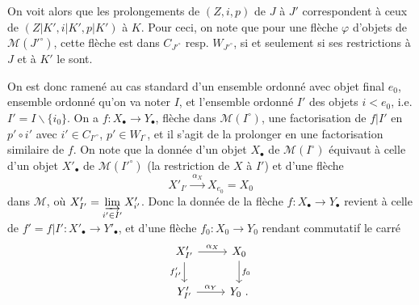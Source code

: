 \documentclass[11pt]{article}
\newcommand{\printedpage}[1]{\marginpar{\footnotesize p.~#1\ifstrequal{#1}{1}{\\[2pt]{[page 1]}}{}}}
\newcommand{\msp}[1]{\ifstrequal{#1}{page 1}{}{\marginpar{\footnotesize [#1]}}}
\begin{document}
On voit alors que les prolongements de $(Z,i,p)$ de $J$ à $J'$ correspondent à ceux de $(Z|K',i|K',p|K')$ à $K$. Pour ceci, on note que pour une flèche $\varphi$ d'objets de $\mathcal{M}(J'^\circ)$, cette flèche est dans $C_{J'^\circ}$ resp. $W_{J'^\circ}$, si et seulement si ses restrictions à $J$ et à $K'$ le sont.

On est donc ramené au cas standard d'un ensemble ordonné avec objet final $e_0$, ensemble ordonné qu'on va noter $I$, et l'ensemble ordonné $I'$ des objets $i<e_0$, i.e. $I'=I\backslash\{i_0\}$. %
On a $f:X_\bullet\longrightarrow Y_\bullet$, flèche dans $\mathcal{M}(I^\circ)$, une factorisation de $f|I'$ en $p'\circ i'$ avec $i'\in C_{I'^\circ}$, $p'\in W_{I^\circ}$, %
\msp{47}
et il s'agit de la prolonger en une factorisation similaire de $f$. On note que la donnée d'un objet $X_\bullet$ de $\mathcal{M}(I^\circ)$ équivaut à celle d'un objet $X'_\bullet$ de $\mathcal{M}(I'^\circ)$ (la restriction de $X$ à $I'$) et d'une flèche
\[
X'_{I'} \xrightarrow{\ \alpha_X\ } X_{e_0}=X_0
\]
dans $\mathcal{M}$, où $X'_{I'}=\varinjlim\limits_{i'\in I'}X'_{i'}$. Donc la donnée de la flèche $f:X_\bullet\longrightarrow Y_\bullet$ revient à celle de $f'=f|I':X'_\bullet\longrightarrow Y'_\bullet$, et d'une flèche $f_0:X_0\longrightarrow Y_0$ rendant commutatif le carré
\printedpage{25}
\[
\begin{tikzcd}
X'_{I'} \arrow[r, "\alpha_X"] \arrow[d, "f'_{I'}"'] & X_0 \arrow[d, "f_0"] \\
Y'_{I'} \arrow[r, "\alpha_Y"] & Y_0\ .
\end{tikzcd}
\]
\end{document}
